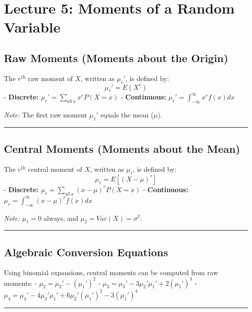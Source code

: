 \documentclass[
]{article}
\begin{document}
\section{Lecture 5: Moments of a Random
Variable}\label{lecture-5-moments-of-a-random-variable}

\subsection{Raw Moments (Moments about the
Origin)}\label{raw-moments-moments-about-the-origin}

The \(r^{\text{th}}\) raw moment of \(X\), written as \(\mu_r'\), is
defined by: \[\mu_r' = E(X^r)\] - \textbf{Discrete:}
\(\mu_r' = \sum_{all\,x} x^r P(X=x)\) - \textbf{Continuous:}
\(\mu_r' = \int_{-\infty}^{\infty} x^r f(x) dx\)

\emph{Note:} The first raw moment \(\mu_1'\) equals the mean (\(\mu\)).

\begin{center}\rule{0.5\linewidth}{0.5pt}\end{center}

\subsection{Central Moments (Moments about the
Mean)}\label{central-moments-moments-about-the-mean}

The \(r^{\text{th}}\) central moment of \(X\), written as \(\mu_r\), is
defined by: \[\mu_r = E[(X - \mu)^r]\] - \textbf{Discrete:}
\(\mu_r = \sum_{all\,x} (x - \mu)^r P(X=x)\) - \textbf{Continuous:}
\(\mu_r = \int_{-\infty}^{\infty} (x - \mu)^r f(x) dx\)

\emph{Note:} \(\mu_1 = 0\) always, and \(\mu_2 = Var(X) = \sigma^2\).

\begin{center}\rule{0.5\linewidth}{0.5pt}\end{center}

\subsection{Algebraic Conversion
Equations}\label{algebraic-conversion-equations}

Using binomial expansions, central moments can be computed from raw
moments: - \(\mu_2 = \mu_2' - (\mu_1')^2\) -
\(\mu_3 = \mu_3' - 3\mu_2'\mu_1' + 2(\mu_1')^3\) -
\(\mu_4 = \mu_4' - 4\mu_3'\mu_1' + 6\mu_2'(\mu_1')^2 - 3(\mu_1')^4\)

\begin{center}\rule{0.5\linewidth}{0.5pt}\end{center}
\end{document}
